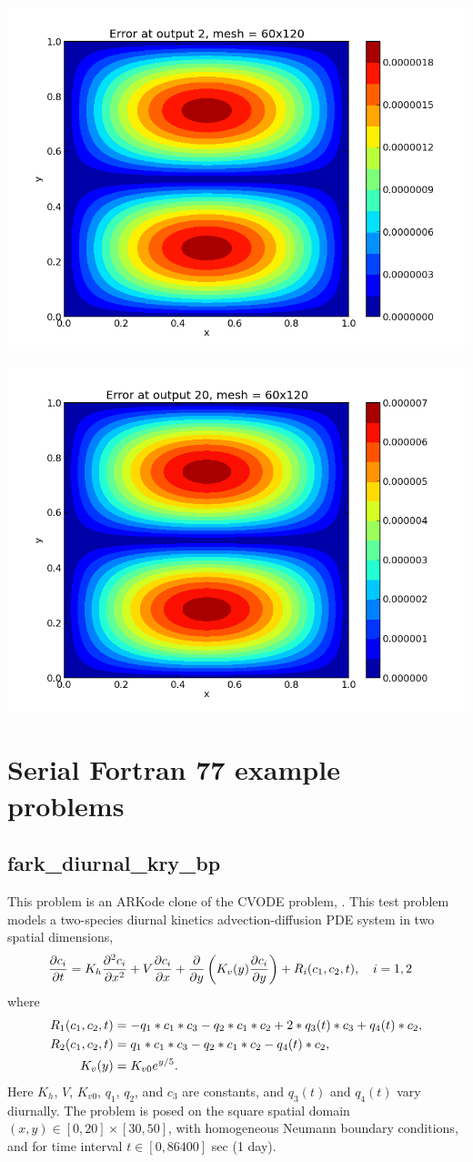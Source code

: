 \documentclass[letterpaper,10pt,english]{sphinxmanual}
\begin{document}
\includegraphics[width=0.300\linewidth]{plot-ark_heat2d_err_2.png}

\includegraphics[width=0.300\linewidth]{plot-ark_heat2d_err_3.png}


\chapter{Serial Fortran 77 example problems}
\label{f77_serial:serial-fortran-77-example-problems}\label{f77_serial::doc}\label{f77_serial:serial-f77}

\section{fark\_diurnal\_kry\_bp}
\label{f77_serial:fark-diurnal-kry-bp}\label{f77_serial:id1}
This problem is an ARKode clone of the CVODE problem,
.  This test problem models a two-species
diurnal kinetics advection-diffusion PDE system in two spatial
dimensions,
\begin{gather}
\begin{split}\frac{\partial c_i}{\partial t} &=
  K_h \frac{\partial^2 c_i}{\partial x^2} +
  V \frac{\partial     c_i}{\partial x} +
  \frac{\partial}{\partial y}\left( K_v(y)
  \frac{\partial c_i}{\partial y}\right) +
  R_i(c_1,c_2,t),\quad i=1,2\end{split}\notag
\end{gather}
where
\begin{gather}
\begin{split}R_1(c_1,c_2,t) &= -q_1*c_1*c_3 - q_2*c_1*c_2 + 2*q_3(t)*c_3 + q_4(t)*c_2, \\
R_2(c_1,c_2,t) &=  q_1*c_1*c_3 - q_2*c_1*c_2 - q_4(t)*c_2, \\
K_v(y) &= K_{v0} e^{y/5}.\end{split}\notag
\end{gather}
Here $K_h$, $V$, $K_{v0}$, $q_1$, $q_2$,
and $c_3$ are constants, and $q_3(t)$ and $q_4(t)$
vary diurnally.  The problem is posed on the square spatial domain
$(x,y) \in [0,20]\times[30,50]$, with homogeneous Neumann
boundary conditions, and for time interval $t\in [0,86400]$ sec
(1 day).
\end{document}

